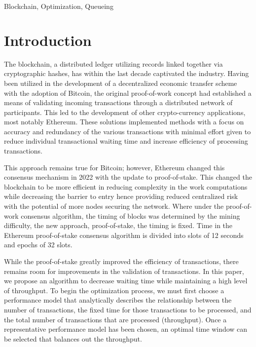 \documentclass[conference]{IEEEtran}
\begin{document}
\begin{IEEEkeywords}
Blockchain, Optimization, Queueing
\end{IEEEkeywords}

\section{Introduction}\label{Intro}

The blockchain, a distributed ledger utilizing records linked together via cryptographic 
hashes, has within the last decade captivated the industry. Having been utilized in the 
development of a decentralized economic transfer scheme with the adoption of 
Bitcoin\cite{2008_Bitcoin_Nakamoto}, the original proof-of-work concept had established 
a means of validating incoming transactions through a distributed network of participants. 
This led to the development of other crypto-currency applications, most notably Ethereum. 
These solutions implemented methods with a focus on accuracy and redundancy of the 
various transactions with minimal effort given to reduce individual transactional waiting 
time and increase efficiency of processing transactions.

This approach remains true for Bitcoin; however, Ethereum changed this consensus 
mechanism in 2022 with the update to proof-of-stake\cite{2022_Ethereum_PoS}. This 
changed the blockchain to be more efficient in reducing complexity in the work 
computations while decreasing the barrier to entry hence providing reduced centralized 
risk with the potential of more nodes securing the network. Where under the proof-of-work
consensus algorithm, the timing of blocks was determined by the mining difficulty, the 
new approach, proof-of-stake, the timing is fixed. Time in the Ethereum proof-of-stake 
consensus algorithm is divided into slots of 12 seconds and epochs of 32 slots.

While the proof-of-stake greatly improved the efficiency of transactions, there remains 
room for improvements in the validation of transactions. In this paper, we propose an 
algorithm to decrease waiting time while maintaining a high level of throughput. To begin 
the optimization process, we must first choose a performance model that analytically 
describes the relationship between the number of transactions, the fixed time for those 
transactions to be processed, and the total number of transactions that are processed 
(throughput). Once a representative performance model has been chosen, an optimal
time window can be selected that balances out the throughput. 
\end{document}
